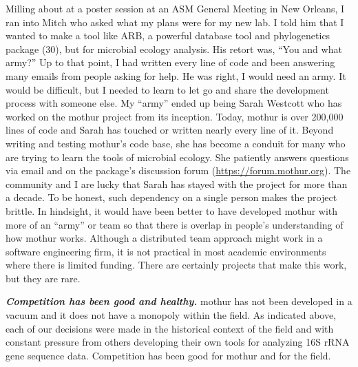 \documentclass[11pt,]{article}
\begin{document}
Milling about at a poster session at an ASM General Meeting in New
Orleans, I ran into Mitch who asked what my plans were for my new lab. I
told him that I wanted to make a tool like ARB, a powerful database tool
and phylogenetics package (30), but for microbial ecology analysis. His
retort was, ``You and what army?'' Up to that point, I had written every
line of code and been answering many emails from people asking for help.
He was right, I would need an army. It would be difficult, but I needed
to learn to let go and share the development process with someone else.
My ``army'' ended up being Sarah Westcott who has worked on the mothur
project from its inception. Today, mothur is over 200,000 lines of code
and Sarah has touched or written nearly every line of it. Beyond writing
and testing mothur's code base, she has become a conduit for many who
are trying to learn the tools of microbial ecology. She patiently
answers questions via email and on the package's discussion forum
(\url{https://forum.mothur.org}). The community and I are lucky that
Sarah has stayed with the project for more than a decade. To be honest,
such dependency on a single person makes the project brittle. In
hindsight, it would have been better to have developed mothur with more
of an ``army'' or team so that there is overlap in people's
understanding of how mothur works. Although a distributed team approach
might work in a software engineering firm, it is not practical in most
academic environments where there is limited funding. There are
certainly projects that make this work, but they are rare.

\textbf{\emph{Competition has been good and healthy.}} mothur has not
been developed in a vacuum and it does not have a monopoly within the
field. As indicated above, each of our decisions were made in the
historical context of the field and with constant pressure from others
developing their own tools for analyzing 16S rRNA gene sequence data.
Competition has been good for mothur and for the field.
\end{document}
